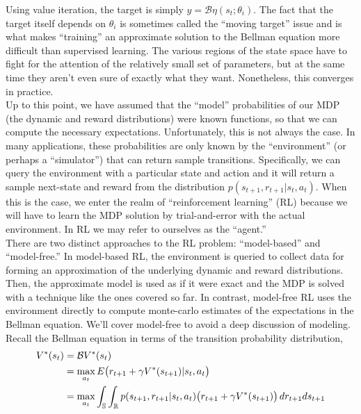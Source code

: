 Using value iteration, the target is simply $y = \mathcal{B}\eta(s_t;\theta_i)$. The fact that the target itself depends on $\theta_i$ is sometimes called the ``moving target'' issue and is what makes ``training'' an approximate solution to the Bellman equation more difficult than supervised learning. The various regions of the state space have to fight for the attention of the relatively small set of parameters, but at the same time they aren't even sure of exactly what they want. Nonetheless, this converges in practice.\\

Up to this point, we have assumed that the ``model'' probabilities of our MDP (the dynamic and reward distributions) were known functions, so that we can compute the necessary expectations. Unfortunately, this is not always the case. In many applications, these probabilities are only known by the ``environment'' (or perhaps a ``simulator'') that can return sample transitions. Specifically, we can query the environment with a particular state and action and it will return a sample next-state and reward from the distribution $p(s_{t+1}, r_{t+1}|s_t,a_t)$. When this is the case, we enter the realm of ``reinforcement learning'' (RL) because we will have to learn the MDP solution by trial-and-error with the actual environment. In RL we may refer to ourselves as the ``agent.''\\

There are two distinct approaches to the RL problem: ``model-based'' and ``model-free.'' In model-based RL, the environment is queried to collect data for forming an approximation of the underlying dynamic and reward distributions. Then, the approximate model is used as if it were exact and the MDP is solved with a technique like the ones covered so far. In contrast, model-free RL uses the environment directly to compute monte-carlo estimates of the expectations in the Bellman equation. We'll cover model-free to avoid a deep discussion of modeling.\\

Recall the Bellman equation in terms of the transition probability distribution,
\begin{align*}
V^*(s_t) &= \mathcal{B}V^*(s_t)\\
&= \max_{a_t} E\big{(}r_{t+1} + \gamma V^*(s_{t+1}) | s_t, a_t\big{)}\\
&= \max_{a_t} \int_{\mathbb{S}}\int_{\mathbb{R}}p(s_{t+1},r_{t+1}|s_t,a_t)\big{(}r_{t+1} + \gamma V^*(s_{t+1})\big{)}\,dr_{t+1}ds_{t+1}
\end{align*}


